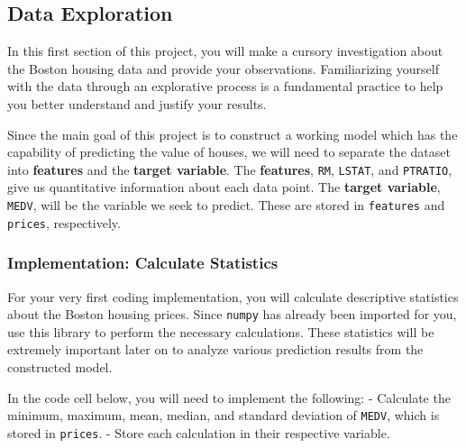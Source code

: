 \documentclass[11pt]{article}
\begin{document}
    \subsection{Data Exploration}\label{data-exploration}

In this first section of this project, you will make a cursory
investigation about the Boston housing data and provide your
observations. Familiarizing yourself with the data through an
explorative process is a fundamental practice to help you better
understand and justify your results.

Since the main goal of this project is to construct a working model
which has the capability of predicting the value of houses, we will need
to separate the dataset into \textbf{features} and the \textbf{target
variable}. The \textbf{features},
\texttt{\textquotesingle{}RM\textquotesingle{}},
\texttt{\textquotesingle{}LSTAT\textquotesingle{}}, and
\texttt{\textquotesingle{}PTRATIO\textquotesingle{}}, give us
quantitative information about each data point. The \textbf{target
variable}, \texttt{\textquotesingle{}MEDV\textquotesingle{}}, will be
the variable we seek to predict. These are stored in \texttt{features}
and \texttt{prices}, respectively.

    \subsubsection{Implementation: Calculate
Statistics}\label{implementation-calculate-statistics}

For your very first coding implementation, you will calculate
descriptive statistics about the Boston housing prices. Since
\texttt{numpy} has already been imported for you, use this library to
perform the necessary calculations. These statistics will be extremely
important later on to analyze various prediction results from the
constructed model.

In the code cell below, you will need to implement the following: -
Calculate the minimum, maximum, mean, median, and standard deviation of
\texttt{\textquotesingle{}MEDV\textquotesingle{}}, which is stored in
\texttt{prices}. - Store each calculation in their respective variable.
\end{document}
